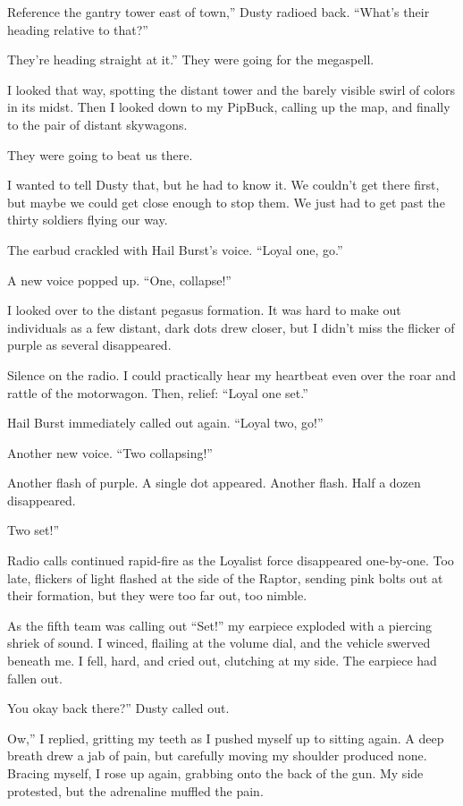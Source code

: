 \leavevmode{}Reference the gantry tower east of town,” Dusty radioed back. “What’s their heading relative to that?”

\leavevmode{}They’re heading straight at it.” They were going for the megaspell.

I looked that way, spotting the distant tower and the barely visible swirl of colors in its midst. Then I looked down to my PipBuck, calling up the map, and finally to the pair of distant skywagons.

They were going to beat us there.

I wanted to tell Dusty that, but he had to know it. We couldn’t get there first, but maybe we could get close enough to stop them. We just had to get past the thirty soldiers flying our way.

The earbud crackled with Hail Burst’s voice. “Loyal one, go.”

A new voice popped up. “One, collapse!”

I looked over to the distant pegasus formation. It was hard to make out individuals as a few distant, dark dots drew closer, but I didn’t miss the flicker of purple as several disappeared.

Silence on the radio. I could practically hear my heartbeat even over the roar and rattle of the motorwagon. Then, relief: “Loyal one set.”

Hail Burst immediately called out again. “Loyal two, go!”

Another new voice. “Two collapsing!”

Another flash of purple. A single dot appeared. Another flash. Half a dozen disappeared.

\leavevmode{}Two set!”

Radio calls continued rapid-fire as the Loyalist force disappeared one-by-one. Too late, flickers of light flashed at the side of the Raptor, sending pink bolts out at their formation, but they were too far out, too nimble.

As the fifth team was calling out “Set!” my earpiece exploded with a piercing shriek of sound. I winced, flailing at the volume dial, and the vehicle swerved beneath me. I fell, hard, and cried out, clutching at my side. The earpiece had fallen out.

\leavevmode{}You okay back there?” Dusty called out.

\leavevmode{}Ow,” I replied, gritting my teeth as I pushed myself up to sitting again. A deep breath drew a jab of pain, but carefully moving my shoulder produced none. Bracing myself, I rose up again, grabbing onto the back of the gun. My side protested, but the adrenaline muffled the pain.

